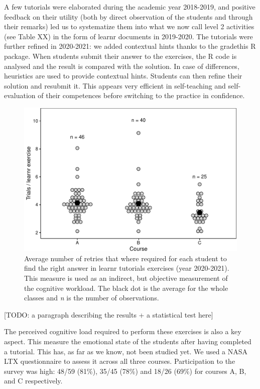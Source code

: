 \documentclass[
]{article}
\begin{document}
A few tutorials were elaborated during the academic year 2018-2019, and
positive feedback on their utility (both by direct observation of the
students and through their remarks) led us to systematize them into what
we now call level 2 activities (see Table XX) in the form of learnr
documents in 2019-2020. The tutorials were further refined in 2020-2021:
we added contextual hints thanks to the gradethis R package. When
students submit their answer to the exercises, the R code is analysed
and the result is compared with the solution. In case of differences,
heuristics are used to provide contextual hints. Students can then
refine their solution and resubmit it. This appears very efficient in
self-teaching and self-evaluation of their competences before switching
to the practice in confidence.

\begin{figure}
\centering
\includegraphics{teaching_data_science_files/figure-latex/fig_learn_trials-1.pdf}
\caption{Average number of retries that where required for each student
to find the right answer in learnr tutorials exercises (year 2020-2021).
This measure is used as an indirect, but objective measurement of the
cognitive workload. The black dot is the average for the whole classes
and \emph{n} is the number of observations.}
\end{figure}

{[}TODO: a paragraph describing the results + a statistical test here{]}

The perceived cognitive load required to perform these exercises is also
a key aspect. This measure the emotional state of the students after
having completed a tutorial. This has, as far as we know, not been
studied yet. We used a NASA LTX questionnaire to assess it across all
three courses. Participation to the survey was high: 48/59 (81\%), 35/45
(78\%) and 18/26 (69\%) for courses A, B, and C respectively.
\end{document}
